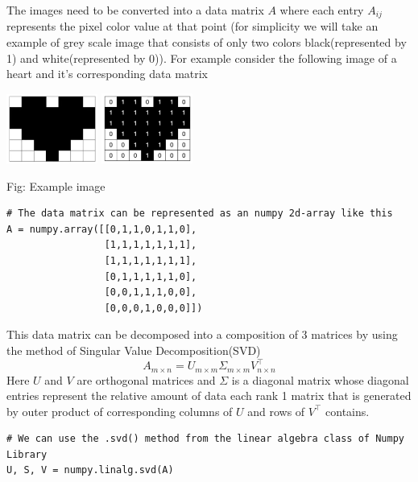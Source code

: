 \documentclass{article}
\begin{document}
The images need to be converted into a data matrix $A$ where each entry $A_{ij}$ represents the pixel color value at that point (for simplicity we will take an example of grey scale image that consists of only two colors black(represented by 1) and white(represented by 0)). For example consider the following image of a heart and it's corresponding data matrix\\

\begin{center}
    \includegraphics[width=3cm]{heart.png} \hspace{2cm}
    \includegraphics[width=3cm]{pixel-value-heart.png}
\end{center}

\begin{center}
    Fig: Example image
\end{center}

\begin{verbatim}
# The data matrix can be represented as an numpy 2d-array like this
A = numpy.array([[0,1,1,0,1,1,0],
                 [1,1,1,1,1,1,1],
                 [1,1,1,1,1,1,1],
                 [0,1,1,1,1,1,0],
                 [0,0,1,1,1,0,0],
                 [0,0,0,1,0,0,0]])
\end{verbatim}

This data matrix can be decomposed into a composition of 3 matrices by using the method of Singular Value Decomposition(SVD)
$$ A_{m \times n} = U_{m \times m} \Sigma_{m \times m} V^{\top}_{n \times n} $$
Here $U$ and $V$ are orthogonal matrices and $\Sigma$ is a diagonal matrix whose diagonal entries represent the relative amount of data each rank 1 matrix that is generated by outer product of corresponding columns of $U$ and rows of $V^{\top}$ contains. \\

\begin{verbatim}
# We can use the .svd() method from the linear algebra class of Numpy Library
U, S, V = numpy.linalg.svd(A)
\end{verbatim}
\end{document}
